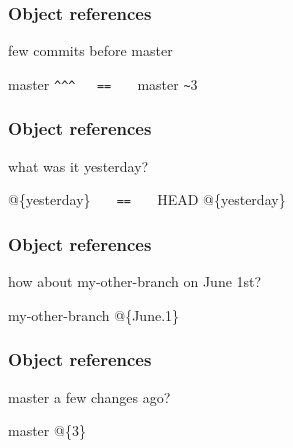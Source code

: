 \documentclass[english]{beamer}
\newcommand{\faint}[1]{%
\textcolor{code-gray}{#1}%
}
\begin{document}
\begin{frame}[fragile]
\frametitle{Object references}

few commits before master

\vspace{.1\textheight}
\begin{center}
        \faint{master}\verb!^^^   ==   ! \faint{master}\verb!~!3
\end{center}

\end{frame}

\begin{frame}[fragile]
\frametitle{Object references}

what was it yesterday?

\vspace{.1\textheight}
\begin{center}
        @\{yesterday\} \verb!   ==   ! \faint{HEAD}@\{yesterday\}
\end{center}

\end{frame}

\begin{frame}
\frametitle{Object references}

how about my-other-branch on June 1st?

\vspace{.1\textheight}
\begin{center}
        \faint{my-other-branch}@\{June.1\}
\end{center}

\end{frame}

\begin{frame}
\frametitle{Object references}

master a few changes ago?

\vspace{.1\textheight}
\begin{center}
        \faint{master}@\{3\}
\end{center}

\end{frame}
\end{document}
